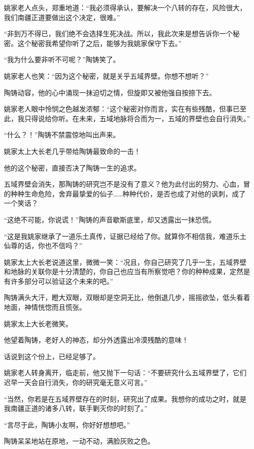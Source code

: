 \begin{this_body}
姚家老人点头，郑重地道：“我必须得承认，要解决一个八转的存在，风险很大，我们南疆正道要做出这个决定，很难。”

“非到万不得已，我们绝不会选择生死决战。所以，我此次来是想告诉你一个秘密。这个秘密我希望你听了之后，能够为我姚家保守下去。”

“我为什么要非听不可呢？”陶铸笑了。

姚家老人也笑：“因为这个秘密，就是关乎五域界壁。你想不想听？”

陶铸动容，他的心中涌现一抹迫切之情，但旋即又被他强自按捺下去。

姚家老人眼中怜悯之色越发浓郁：“这个秘密对你而言，实在有些残酷，但事已至此，我只得说给你听。在未来，五域地脉将合而为一，五域的界壁也会自行消失。”

“什么？！”陶铸不禁震惊地叫出声来。

姚家太上大长老几乎带给陶铸最致命的一击！

他的这个秘密，直接否决了陶铸一生的追求。

五域界壁会消失，那陶铸的研究岂不是没有了意义？他为此付出的努力、心血，冒的种种生命危险，舍弃最挚爱的仙子……种种代价，是否也成了对他的讽刺，成了一个笑话？

“这绝不可能，你说谎！”陶铸的声音歇斯底里，却又透露出一抹恐慌。

“这是我姚家继承了一道乐土真传，证据已经给了你。就算你不相信我，难道乐土仙尊的话，你也不信吗？”

姚家太上大长老说道这里，微微一笑：“况且，你自己研究了几乎一生，五域界壁和地脉的关联你是十分清楚的，你自己也应当有所察觉吧？你的种种成果，定然是有许多部分可以验证这个未来的吧。”

陶铸满头大汗，瞪大双眼，双眼却是空洞无比，他倒退几步，摇摇欲坠，低头看着地面，神情恍惚而且慌张。

姚家太上大长老微笑。

他望着陶铸，老好人的神态，却分外透露出冷漠残酷的意味！

话说到这个份上，已经足够了。

姚家老人转身离开，临走前，他又抛下一句话：“不要研究什么五域界壁了，它们迟早一天会自行消失，你的研究毫无意义可言。”

“当然，你若是在五域界壁存在的时刻，研究出了成果。我想你的成功之时，就是我南疆正道的诸多八转，联手剿灭你的时刻了。”

“言尽于此，陶铸小友啊，你好好想想吧。”

陶铸呆呆地站在原地，一动不动，满脸灰败之色。


\end{this_body}
